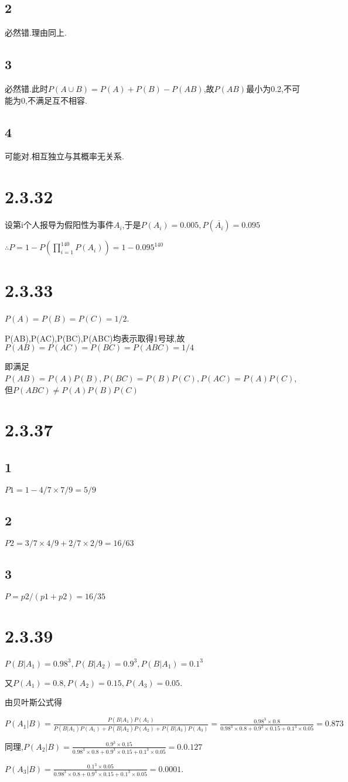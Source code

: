 \documentclass[12pt,a4paper]{ctexart}
\begin{document}
\subsection*{2}
必然错.理由同上.
\subsection*{3}
必然错.此时$P(A\cup B)=P(A)+P(B)-P(AB)$,故$P(AB)$最小为0.2,不可能为0,不满足互不相容.
\subsection*{4}
可能对.相互独立与其概率无关系.
\section*{2.3.32}
设第i个人报导为假阳性为事件$A_i$,于是$P(A_i)=0.005,P(\overline{A_i})=0.095$

$\therefore P=1-P(\prod _{i=1}^{140} P(A_i))=1-0.095^{140}$
\section*{2.3.33}
$P(A)=P(B)=P(C)=1/2$.

P(AB),P(AC),P(BC),P(ABC)均表示取得1号球,故$P(AB)=P(AC)=P(BC)=P(ABC)=1/4$

即满足$P(AB)=P(A)P(B),P(BC)=P(B)P(C),P(AC)=P(A)P(C)$,但$P(ABC)\neq P(A)P(B)P(C)$
\section*{2.3.37}
\subsection*{1}
$P1=1-4/7\times 7/9=5/9$
\subsection*{2}
$P2=3/7\times 4/9+2/7\times 2/9=16/63$
\subsection*{3}
$P=p2/(p1+p2)=16/35$
\section*{2.3.39}
$P(B|A_1)=0.98^3,P(B|A_2)=0.9^3,P(B|A_1)=0.1^3$

又$P(A_1)=0.8,P(A_2)=0.15,P(A_3)=0.05$.

由贝叶斯公式得

$P(A_1|B)=\frac{P(B|A_1)P(A_1)}{P(B|A_1)P(A_1)+P(B|A_2)P(A_2)+P(B|A_3)P(A_3)}=\frac{0.98^3\times 0.8}{0.98^3\times 0.8+0.9^3\times 0.15+0.1^3\times 0.05}=0.873$

同理,$P(A_2|B)=\frac{0.9^3\times 0.15}{0.98^3\times 0.8+0.9^3\times 0.15+0.1^3\times 0.05}=0.0.127$

$P(A_3|B)=\frac{0.1^3\times 0.05}{0.98^3\times 0.8+0.9^3\times 0.15+0.1^3\times 0.05}=0.0001$.
\end{document}
